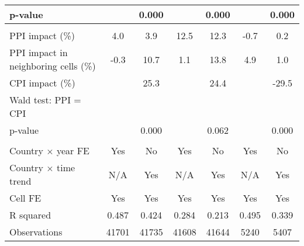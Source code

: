 {\begin{tabular}{l*{6}{c}}
\hspace{15pt} p-value&                     &       0.000         &                     &       0.000         &                     &       0.000         \\
\hline \\ PPI impact (\%)&         4.0         &         3.9         &        12.5         &        12.3         &        -0.7         &         0.2         \\
PPI impact in neighboring cells (\%)&        -0.3         &        10.7         &         1.1         &        13.8         &         4.9         &         1.0         \\
CPI impact (\%)     &                     &        25.3         &                     &        24.4         &                     &       -29.5         \\
Wald test: PPI = CPI&                     &                     &                     &                     &                     &                     \\
\hspace{15pt} p-value&                     &       0.000         &                     &       0.062         &                     &       0.000         \\
\hline \\ Country $\times$ year FE&         Yes         &          No         &         Yes         &          No         &         Yes         &          No         \\
Country $\times$ time trend&         N/A         &         Yes         &         N/A         &         Yes         &         N/A         &         Yes         \\
Cell FE             &         Yes         &         Yes         &         Yes         &         Yes         &         Yes         &         Yes         \\
R squared           &       0.487         &       0.424         &       0.284         &       0.213         &       0.495         &       0.339         \\
Observations        &       41701         &       41735         &       41608         &       41644         &        5240         &        5407         \\
\hline\hline
\end{tabular}
}
